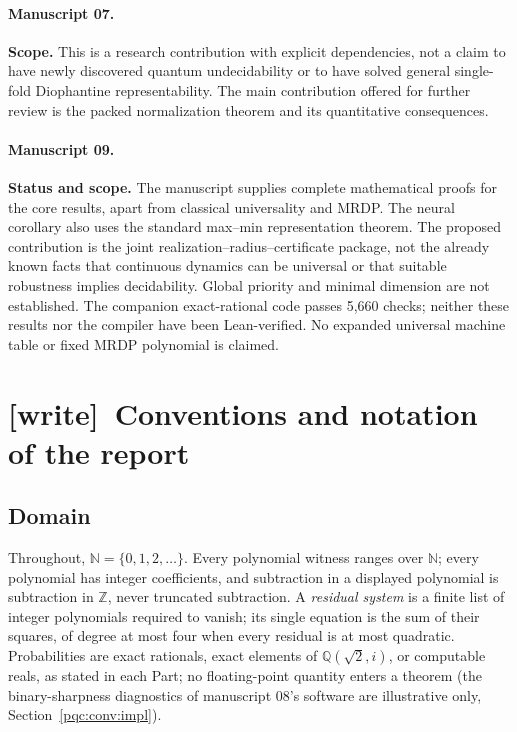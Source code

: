 \documentclass[11pt,letterpaper]{article}
\numberwithin{equation}{section}
\theoremstyle{definition}
\theoremstyle{remark}
\newcommand{\N}{\mathbb N}
\newcommand{\Z}{\mathbb Z}
\newcommand{\Q}{\mathbb Q}
\newcommand{\wtag}{\textup{[write]}}
\begin{document}
\paragraph{Manuscript 07.}
\noindent\textbf{Scope.} This is a research contribution with explicit dependencies, not a claim to have newly discovered quantum undecidability or to have solved general single-fold Diophantine representability. The main contribution offered for further review is the packed normalization theorem and its quantitative consequences.

\paragraph{Manuscript 09.}
\textbf{Status and scope.} The manuscript supplies complete mathematical proofs
for the core results, apart from classical universality and MRDP.  The neural
corollary also uses the standard max--min representation theorem.
The proposed contribution is the joint realization--radius--certificate
package, not the already known facts that continuous dynamics can be universal
or that suitable robustness implies decidability.  Global priority and minimal
dimension are not established.  The companion exact-rational code passes
5,660 checks; neither these results nor the compiler have been Lean-verified.
No expanded universal machine table or fixed MRDP polynomial is claimed.

\section{\wtag\ Conventions and notation of the report}
\label{pqc:conv}

\subsection{Domain}
Throughout, $\N=\{0,1,2,\ldots\}$. Every polynomial witness ranges over $\N$;
every polynomial has integer coefficients, and subtraction in a displayed
polynomial is subtraction in $\Z$, never truncated subtraction. A
\emph{residual system} is a finite list of integer polynomials required to
vanish; its single equation is the sum of their squares, of degree at most
four when every residual is at most quadratic. Probabilities are exact
rationals, exact elements of $\Q(\sqrt2,i)$, or computable reals, as stated
in each Part; no floating-point quantity enters a theorem (the
binary-sharpness diagnostics of manuscript 08's software are illustrative
only, Section~\ref{pqc:conv:impl}).
\end{document}
